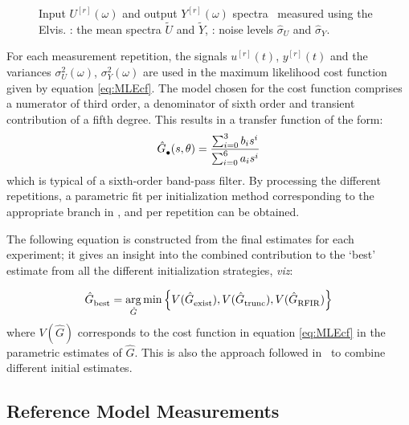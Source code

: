\begin{figure}
  \centering
  \setlength{\figurewidth}{0.75\onecolumnwidth}
  \setlength{\figureheight}{0.68\figurewidth}
  \caption[Measured input/output spectra of \BK{} filter.]{Input $U^{[r]}(\omega)$ and output $Y^{[r]}(\omega)$ spectra~ measured using the Elvis.
  : the mean spectra $\tilde{U}$ and $\tilde{Y}$, : noise levels $\hat\sigma_U$ and $\hat\sigma_Y$.}
  \label{fig:SpectraMeasurement}
\end{figure}

For each measurement repetition, the signals $u^{[r]}(t)$, $y^{[r]}(t)$ and the variances $\sigma_U^2(\omega)$, $\sigma_Y^2(\omega)$ are used in the maximum likelihood cost function given by equation \eqref{eq:MLEcf}.
The model chosen for the cost function comprises a numerator of third order, a denominator of sixth order and transient contribution of a fifth degree. This results in a transfer function of the form:
\begin{equation}
  \hat{G}_{\mathrm{\bullet}}^{\mathrm{}}(s,\theta) = \frac{\sum_{i=0}^3 b_i s^i}{\sum_{i=0}^6 a_i s^i}
\end{equation}
which is typical of a sixth-order band-pass filter.
By processing the different repetitions, a parametric fit per initialization method corresponding to the appropriate branch in , and per repetition can be obtained. 


The following equation is constructed from the final estimates for each experiment; it gives an insight into the combined contribution to the `best' estimate from all the different initialization strategies, \emph{viz}:

\begin{equation}\label{eq:selectBest}
  \hat{G}_{\mathrm{best}}^{\mathrm{}} = 
    \operatorname*{arg}_{\hat{G}} 
    \min 
    \left\{ 
      V(\hat{G}_{\mathrm{exist}}^{\mathrm{}}),
      V(\hat{G}_{\mathrm{trunc}}^{\mathrm{}}),
      V(\hat{G}_{\mathrm{RFIR}}^{\mathrm{}})
    \right\}
\end{equation}
where $V(\hat{G})$ corresponds to the cost function in equation \eqref{eq:MLEcf} in the parametric estimates of $\hat{G}$.
This is also the approach followed in~\citep{FDIDENT} to combine different initial estimates.

\subsection{Reference Model Measurements}

